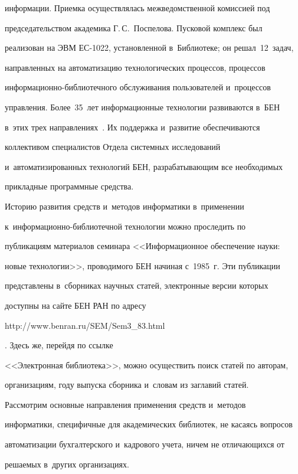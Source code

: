 информации. Приемка осуществлялась межведомственной комиссией под 


председательством академика Г.\,С.~Поспелова. Пусковой комплекс был 


реализован на ЭВМ ЕС-1022, установленной в~Библиотеке; он решал~12~задач, 


направленных на автоматизацию технологических процессов, процессов 


информационно-библиотечного обслуживания пользователей и~процессов 


управления. Более~35~лет информационные технологии развиваются в~БЕН 


в~этих трех направлениях~\cite{5-vla}. Их поддержка и~развитие обеспечиваются 


коллективом специалистов Отдела системных исследований 


и~автоматизированных технологий БЕН, разрабатывающим все необходимых 


прикладные программные средства.


  


  Историю развития средств и~методов информатики в~применении  


к~ин\-фор\-ма\-ци\-он\-но-биб\-лио\-теч\-ной технологии можно проследить по 


публикациям материалов семинара <<Информационное обеспечение науки: 


новые технологии>>, проводимого БЕН начиная с~1985~г. Эти публикации 


представлены в~сборниках научных статей, электронные версии которых 


доступны на сайте БЕН РАН по адресу {\sf 


http://www.benran.ru/SEM/Sem3\_83.html}. Здесь же, перейдя по ссылке 


<<Электронная библиотека>>, можно осуществить поиск статей по авторам, 


организациям, году выпуска сборника и~словам из заглавий статей. 


  


  Рассмотрим основные направления применения средств и~методов 


информатики, специфичные для академических библиотек, не касаясь вопросов 


автоматизации бухгалтерского и~кадрового учета, ничем не отличающихся от 


решаемых в~других организациях.


